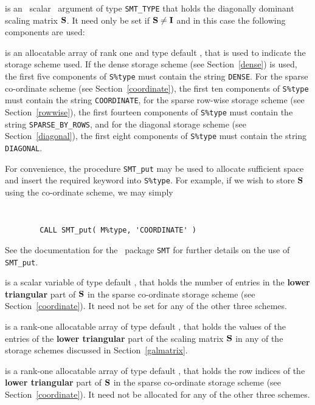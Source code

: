 \documentclass{galahad}
\begin{document}
\begin{description}
 is an \optional\ scalar \intentin\ argument of type {\tt SMT\_TYPE}
that holds the diagonally dominant scaling matrix ${\mathbf{S}}$. It need only be set
if ${\mathbf{S}} \neq {\mathbf{I}}$ and in this case the following components are used:

\begin{description}

 is an allocatable array of rank one and type default
\character, that
is used to indicate the storage scheme used. If the dense storage scheme
(see Section~\ref{dense}) is used,
the first five components of {\tt S\%type} must contain the
string {\tt DENSE}.
For the sparse co-ordinate scheme (see Section~\ref{coordinate}),
the first ten components of {\tt S\%type} must contain the
string {\tt COORDINATE},
for the sparse row-wise storage scheme (see Section~\ref{rowwise}),
the first fourteen components of {\tt S\%type} must contain the
string {\tt SPARSE\_BY\_ROWS},
and for the diagonal storage scheme (see Section~\ref{diagonal}),
the first eight components of {\tt S\%type} must contain the
string {\tt DIAGONAL}.

For convenience, the procedure {\tt SMT\_put}
may be used to allocate sufficient space and insert the required keyword
into {\tt S\%type}.
For example, if we wish to store ${\mathbf{S}}$ using the co-ordinate scheme,
we may simply
{\tt
\begin{verbatim}
        CALL SMT_put( M%type, 'COORDINATE' )
\end{verbatim}
}
\noindent
See the documentation for the \galahad\ package {\tt SMT}
for further details on the use of {\tt SMT\_put}.

 is a scalar variable of type default \integer, that
holds the number of entries in the {\bf lower triangular} part of ${\mathbf{S}}$
in the sparse co-ordinate storage scheme (see Section~\ref{coordinate}).
It need not be set for any of the other three schemes.

 is a rank-one allocatable array of type default \realdp, that holds
the values of the entries of the {\bf lower triangular} part
of the scaling matrix ${\mathbf{S}}$ in any of the
storage schemes discussed in Section~\ref{galmatrix}.

 is a rank-one allocatable array of type default \integer,
that holds the row indices of the {\bf lower triangular} part of ${\mathbf{S}}$
in the sparse co-ordinate storage
scheme (see Section~\ref{coordinate}).
It need not be allocated for any of the other three schemes.


\end{description}
\end{description}
\end{document}
